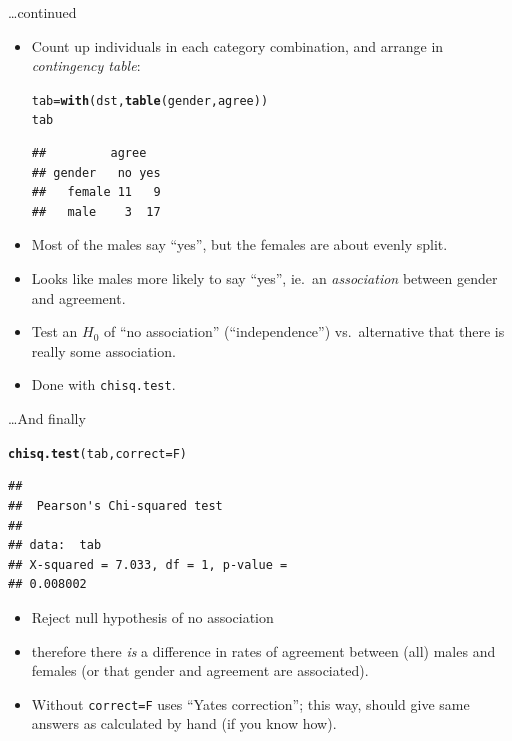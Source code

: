 \documentclass[unknownkeysallowed]{beamer}\usepackage[]{graphicx}\usepackage[]{color}
\makeatletter
\newcommand{\hlstd}[1]{\textcolor[rgb]{0.345,0.345,0.345}{#1}}%
\newcommand{\hlkwb}[1]{\textcolor[rgb]{0.69,0.353,0.396}{#1}}%
\newcommand{\hlkwc}[1]{\textcolor[rgb]{0.333,0.667,0.333}{#1}}%
\newcommand{\hlkwd}[1]{\textcolor[rgb]{0.737,0.353,0.396}{\textbf{#1}}}%
\newenvironment{kframe}{%
 \def\at@end@of@kframe{}%
 \ifinner\ifhmode%
  \def\at@end@of@kframe{\end{minipage}}%
  \begin{minipage}{\columnwidth}%
 \fi\fi%
 \def\FrameCommand##1{\hskip\@totalleftmargin \hskip-\fboxsep
 \colorbox{shadecolor}{##1}\hskip-\fboxsep
     \hskip-\linewidth \hskip-\@totalleftmargin \hskip\columnwidth}%
 \MakeFramed {\advance\hsize-\width
   \@totalleftmargin\z@ \linewidth\hsize
   \@setminipage}}%
 {\par\unskip\endMakeFramed%
 \at@end@of@kframe}
\newenvironment{knitrout}{}{} %
\makeatother
\begin{document}
\begin{frame}[fragile]{\ldots continued}
  
  \begin{itemize}
  \item Count up individuals in each category combination, and arrange
  in \emph{contingency table}:
  
\begin{knitrout}
\color{fgcolor}\begin{kframe}
\begin{alltt}
\hlstd{tab}\hlkwb{=}\hlkwd{with}\hlstd{(dst,}\hlkwd{table}\hlstd{(gender,agree))}
\hlstd{tab}
\end{alltt}
\begin{verbatim}
##         agree
## gender   no yes
##   female 11   9
##   male    3  17
\end{verbatim}
\end{kframe}
\end{knitrout}

\item Most of the males say ``yes'', but the females are about evenly
  split. 
\item Looks like males more likely to say ``yes'', ie.\
  an \emph{association} between gender and agreement. 
\item Test an $H_0$ of ``no association'' (``independence'') vs.\
  alternative that there is really some association.
\item Done with \texttt{chisq.test}.

  \end{itemize}
  
\end{frame}

\begin{frame}[fragile]{\ldots And finally}
  
\begin{knitrout}
\color{fgcolor}\begin{kframe}
\begin{alltt}
\hlkwd{chisq.test}\hlstd{(tab,}\hlkwc{correct}\hlstd{=F)}
\end{alltt}
\begin{verbatim}
## 
## 	Pearson's Chi-squared test
## 
## data:  tab
## X-squared = 7.033, df = 1, p-value =
## 0.008002
\end{verbatim}
\end{kframe}
\end{knitrout}

\begin{itemize}
\item Reject null hypothesis of no association
\item therefore there \emph{is} a difference in rates of agreement
  between (all) males and females (or that gender and agreement are
  associated). 
\item Without \texttt{correct=F} uses ``Yates correction''; this way,
  should give same answers as calculated by hand (if you know how).
\end{itemize}
  
\end{frame}
\end{document}

